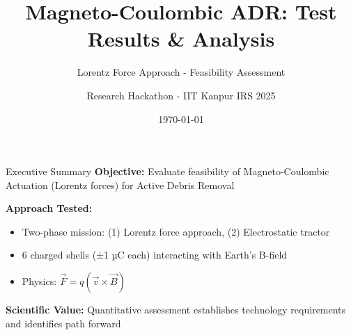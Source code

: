 \documentclass[aspectratio=169]{beamer}
\title{Magneto-Coulombic ADR: Test Results \& Analysis}
\subtitle{Lorentz Force Approach - Feasibility Assessment}
\author{Research Hackathon - IIT Kanpur IRS 2025}
\date{\today}
\begin{document}
\frame{\titlepage}

\begin{frame}{Executive Summary}
\textbf{Objective:} Evaluate feasibility of Magneto-Coulombic Actuation (Lorentz forces) for Active Debris Removal

\vspace{0.5cm}
\textbf{Approach Tested:}
\begin{itemize}
    \item Two-phase mission: (1) Lorentz force approach, (2) Electrostatic tractor
    \item 6 charged shells (±1 µC each) interacting with Earth's B-field
    \item Physics: $\vec{F} = q(\vec{v} \times \vec{B})$
\end{itemize}

\vspace{0.5cm}
\begin{center}
\end{center}

\vspace{0.3cm}
\textbf{Scientific Value:} Quantitative assessment establishes technology requirements and identifies path forward
\end{frame}
\end{document}
